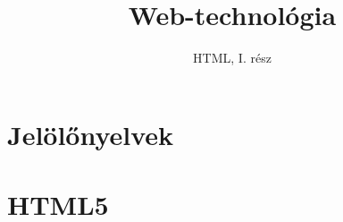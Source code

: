 \documentclass[usenames,dvipsnames,aspectratio=169]{beamer}
\title[Web technológiák - HTML]{Web-technológia}
\subtitle{HTML, I. rész}
\begin{document}
\begin{frame}[plain]
  \titlepage
  \logoalul
\end{frame}

\section{Jelölőnyelvek}



\section{HTML5}
















\end{document}
